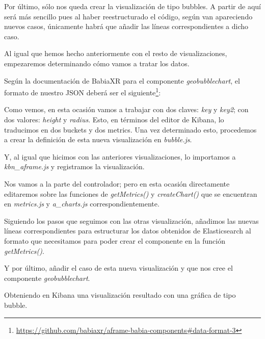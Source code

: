 \documentclass[a4paper, 12pt]{book}
\begin{document}
Por último, sólo nos queda crear la visualización de tipo bubbles. A partir de aquí será más sencillo pues al haber reestructurado el código, según van apareciendo nuevos casos, únicamente habrá que añadir las líneas correspondientes a dicho caso.

Al igual que hemos hecho anteriormente con el resto de visualizaciones, empezaremos determinando cómo vamos a tratar los datos.

Según la documentación de BabiaXR para el componente \textit{geobubblechart}, el formato de nuestro JSON deberá ser el siguiente\footnote{\url{https://github.com/babiaxr/aframe-babia-components#data-format-3}}:



Como vemos, en esta ocasión vamos a trabajar con dos claves: \textit{key} y \textit{key2}; con dos valores: \textit{height} y \textit{radius}. Esto, en términos del editor de Kibana, lo traducimos en dos buckets y dos metrics. Una vez determinado esto, procedemos a crear la definición de esta nueva visualización en \textit{bubble.js}.



Y, al igual que hicimos con las anteriores visualizaciones, lo importamos a \textit{kbn\_aframe.js} y registramos la visualización.



Nos vamos a la parte del controlador; pero en esta ocasión directamente editaremos sobre las funciones de \textit{getMetrics()} y \textit{createChart()} que se encuentran en \textit{metrics.js} y \textit{a\_charts.js} correspondientemente.

Siguiendo los pasos que seguimos con las otras visualización, añadimos las nuevas líneas correspondientes para estructurar los datos obtenidos de Elasticsearch al formato que necesitamos para poder crear el componente en la función \textit{getMetrics()}.



Y por último, añadir el caso de esta nueva visualización y que nos cree el componente \textit{geobubblechart}.

Obteniendo en Kibana una visualización resultado con una gráfica de tipo bubble.
\end{document}
